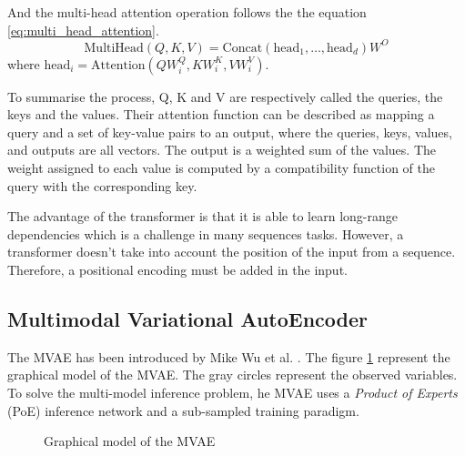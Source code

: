 \documentclass[12pt]{report}
\begin{document}
And the multi-head attention operation follows the the equation \ref{eq:multi_head_attention}.
\begin{equation}
    \text{MultiHead}(Q, K, V) = \text{Concat}(\text{head}_1, \dots, \text{head}_d) W^O
    \label{eq:multi_head_attention}
\end{equation}
where $\text{head}_i = \text{Attention}(QW_i^Q, KW_i^K, VW_i^V)$.

To summarise the process, Q, K and V are respectively called the queries, the keys and the values.
Their attention function can be described as mapping a query and a set of key-value pairs to an output, where the queries, keys, values, and outputs are all vectors.
The output is a weighted sum of the values.
The weight assigned to each value is computed by a compatibility function of the query with the corresponding key.

The advantage of the transformer is that it is able to learn long-range dependencies which is a challenge in many sequences tasks.
However, a transformer doesn't take into account the position of the input from a sequence. 
Therefore, a positional encoding must be added in the input.

\subsection{Multimodal Variational AutoEncoder}
\label{sec:back:mvae}

The MVAE has been introduced by Mike Wu et al. \cite{wu_multimodal_2018}.
The figure \ref{fig:mvae_graph} represent the graphical model of the MVAE.
The gray circles represent the observed variables.
To solve the multi-model inference problem, he MVAE uses a \textit{Product of Experts} (PoE) inference network and a sub-sampled training paradigm.

\begin{figure}[htbp]
\begin{center}
\caption{Graphical model of the MVAE}
\label{fig:mvae_graph}
\end{center}
\end{figure}
\end{document}
